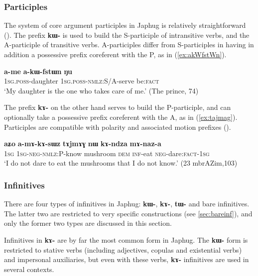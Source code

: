 \documentclass[oldfontcommands,oneside,a4paper,11pt]{article}
\newcommand{\ipa}[1]{\textbf{\phon#1}} %
\begin{document}
\subsubsection{Participles}
The system of core argument participles in Japhug is relatively straightforward (\citealt{jacques16relatives}). The prefix \ipa{kɯ-} is used to build the S-participle of intransitive verbs, and the A-participle of transitive verbs. A-participles differ from S-participles in having in addition a possessive prefix coreferent with the P, as in (\ref{ex:akWfstWn}).

\begin{exe}
\ex \label{ex:akWfstWn}
\gll \ipa{a-me} 	\ipa{a-kɯ-fstɯn} 	\ipa{ŋu} \\
\textsc{1sg.poss}-daughter \textsc{1sg.poss}-\textsc{nmlz}:S/A-serve be:\textsc{fact} \\
\glt `My daughter is the one who takes care of me.' (The prince, 74)
\end{exe}

The prefix \ipa{kɤ-} on the other hand serves to build the P-participle, and can optionally take a possessive prefix coreferent with the A, as in (\ref{ex:tajmag}). Participles are compatible with polarity and associated motion prefixes (\citealt{jacques16relatives}).

\begin{exe}
   \ex \label{ex:tajmag}
   \gll
\ipa{aʑo}  	\ipa{a-mɤ-kɤ-sɯz}   	\ipa{tɤjmɤɣ}  	\ipa{nɯ}  	\ipa{kɤ-ndza}  	\ipa{mɤ-naz-a}  \\
\textsc{1sg} \textsc{1sg-neg-nmlz:P}-know mushroom \textsc{dem} \textsc{inf}-eat \textsc{neg}-dare:\textsc{fact}-\textsc{1sg} \\
\glt `I do not dare to eat the mushrooms that I do not know.' (23 mbrAZim,103)
\end{exe}

\subsubsection{Infinitives} \label{sec:infinitives}
There are four types of infinitives in Japhug: \ipa{kɯ-}, \ipa{kɤ-}, \ipa{tɯ-} and bare infinitives. The latter two are restricted to very specific constructions (see \ref{sec:bareinf}), and only the former two types are discussed in this section. 

Infinitives in \ipa{kɤ-} are by far the most common form in Japhug. The \ipa{kɯ-} form is restricted to stative verbs (including adjectives, copulas and existential verbs) and impersonal auxiliaries, but even with these verbs, \ipa{kɤ-} infinitives are used in several contexts. 
\end{document}
